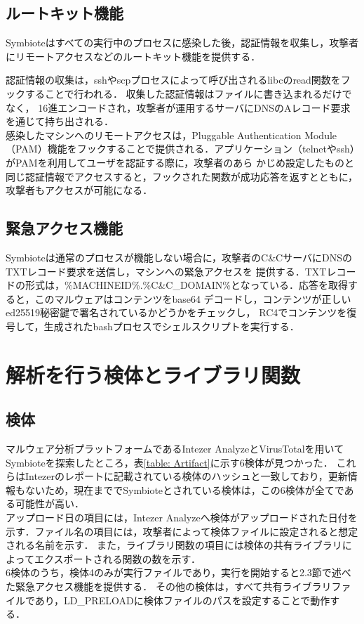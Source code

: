 \documentclass[submit,techreq,noauthor]{eco}	%
\begin{document}
\subsection{ルートキット機能}
Symbioteはすべての実行中のプロセスに感染した後，認証情報を収集し，攻撃者にリモートアクセスなどのルートキット機能を提供する．

認証情報の収集は，sshやscpプロセスによって呼び出されるlibcのread関数をフックすることで行われる．
収集した認証情報はファイルに書き込まれるだけでなく，
16進エンコードされ，攻撃者が運用するサーバにDNSのAレコード要求を通じて持ち出される．\\
\indent
感染したマシンへのリモートアクセスは，Pluggable Authentication
Module（PAM）機能をフックすることで提供される．アプリケーション（telnetやssh）がPAMを利用してユーザを認証する際に，攻撃者のあら
かじめ設定したものと同じ認証情報でアクセスすると，フックされた関数が成功応答を返すとともに，攻撃者もアクセスが可能になる．

\subsection{緊急アクセス機能}
Symbioteは通常のプロセスが機能しない場合に，攻撃者のC\&CサーバにDNSのTXTレコード要求を送信し，マシンへの緊急アクセスを
提供する．TXTレコードの形式は，\%MACHINEID\%.\%C\&C\_DOMAIN\%となっている．応答を取得すると，このマルウェアはコンテンツをbase64
デコードし，コンテンツが正しいed25519秘密鍵で署名されているかどうかをチェックし，
RC4でコンテンツを復号して，生成されたbashプロセスでシェルスクリプトを実行する．\\


\section{解析を行う検体とライブラリ関数}
\subsection{検体}
マルウェア分析プラットフォームであるIntezer AnalyzeとVirusTotalを用いてSymbioteを探索したところ，表\ref{table: Artifact}に示す6検体が見つかった．
これらはIntezerのレポートに記載されている検体のハッシュと一致しており，更新情報もないため，現在まででSymbioteとされている検体は，この6検体が全てである可能性が高い．\\
アップロード日の項目には，Intezer Analyzeへ検体がアップロードされた日付を示す．ファイル名の項目には，攻撃者によって検体ファイルに設定されると想定される名前を示す．
また，ライブラリ関数の項目には検体の共有ライブラリによってエクスポートされる関数の数を示す．\\
\indent
6検体のうち，検体4のみが実行ファイルであり，実行を開始すると2.3節で述べた緊急アクセス機能を提供する．
その他の検体は，すべて共有ライブラリファイルであり，LD\_PRELOADに検体ファイルのパスを設定することで動作する．
\end{document}
